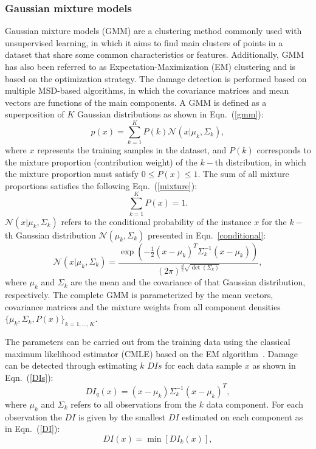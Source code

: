 \subsubsection{Gaussian mixture models}
Gaussian mixture models (GMM) are a clustering method commonly used with unsupervised learning, in which it aims to find main clusters of points in a dataset that share some common characteristics or features.
Additionally, GMM has also been referred to as Expectation-Maximization (EM) clustering and is based on the optimization strategy.
The damage detection is performed based on multiple MSD-based algorithms, in which the covariance matrices and mean vectors are functions of the main components.
A GMM is defined as a superposition of \(K\) Gaussian distributions as shown in Eqn.~(\ref{gmm}):
\begin{equation}
	p(x) = \sum_{k=1}^K P(k) \mathcal{N}(x|\mu_k,\Sigma_k),
	\label{gmm}
\end{equation}
where \(x\) represents the training samples in the dataset, and \(P(k)\) corresponds to the mixture proportion (contribution weight) of the \(k-\)th distribution, in which the mixture proportion must satisfy \(0\leq P(x)\leq 1\).
The sum of all mixture proportions satisfies the following Eqn.~(\ref{mixture}):
\begin{equation}
	\sum_{k=1}^{K}P(x) =1.
	\label{mixture}
\end{equation}  
\(\mathcal{N}(x|\mu_k,\Sigma_k)\) refers to the conditional probability of the instance \(x\) for the \(k-\)th Gaussian distribution \(\mathcal{N}(\mu_k,\Sigma_k)\) presented in Eqn.~\ref{conditional}:
\begin{equation}
	\mathcal{N}(x|\mu_k,\Sigma_k) = \frac{\exp(-\frac{1}{2}(x-\mu_k)^T\Sigma_k^{-1}(x-\mu_k))}{(2\pi)^{\frac{d}{2}\sqrt{\det(\Sigma_k)}}},
	\label{conditional}		
\end{equation}
where \(\mu_k\) and \(\Sigma_k\) are the mean and the covariance of that Gaussian distribution, respectively.
The complete GMM is parameterized by the mean vectors, covariance matrices and the mixture weights from all component densities \(\{\mu_k,\Sigma_k, P(x)\}_{k=1,\hdots,K}\).

The parameters can be carried out from the training data using the classical maximum likelihood estimator (CMLE) based on the EM algorithm~\cite{Dempster1977}.
Damage can be detected through estimating \(k\) \(DIs\) for each data sample \(x\) as shown in Eqn.~(\ref{DIs}):
\begin{equation}
	DI_q(x) = (x-\mu_k)\Sigma_k^{-1}(x-\mu_k)^T,
	\label{DIs}
\end{equation}
where \(\mu_k\) and \(\Sigma_k\) refers to all observations from the \(k\) data component.
For each observation the \(DI\) is given by the smallest \(DI\) estimated on each component as in Eqn.~(\ref{DI}):
\begin{equation}
	DI(x) = \min[DI_k(x)],
	\label{DI}
\end{equation}
